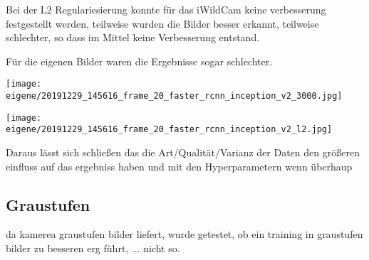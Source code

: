 Bei der L2 Regulariesierung konnte für das iWildCam keine verbesserung festgestellt werden,
teilweise wurden die Bilder besser erkannt, teilweise schlechter, so dass im 
Mittel keine Verbesserung entstand.

Für die eigenen Bilder waren die Ergebnisse sogar schlechter.


\begin{minipage}{0.5\textwidth}
  \centering
  \label{}
  \texttt{[image: eigene/20191229\_145616\_frame\_20\_faster\_rcnn\_inception\_v2\_3000.jpg]}
\end{minipage}
\begin{minipage}{0.5\textwidth}
  \centering
  \label{}
  \texttt{[image: eigene/20191229\_145616\_frame\_20\_faster\_rcnn\_inception\_v2\_l2.jpg]}
\end{minipage}



Daraus lässt sich schließen das die Art/Qualität/Varianz der Daten 
den größeren einfluss auf das ergebniss haben und mit den Hyperparametern 
wenn überhaup



\subsection{Graustufen}
da kamerea graustufen bilder liefert, wurde getestet, ob ein 
training in graustufen bilder zu besseren erg führt, ... nicht so.








